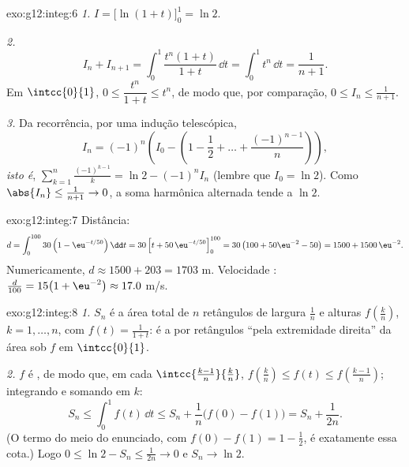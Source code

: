 \begin{solution}{exo:g12:integ:6}
\emph{1.} $I = \bigl[\ln(1+t)\bigr]_0^1 = \ln 2$.

\emph{2.}
\[
I_n + I_{n+1} = \int_0^1 \frac{t^n(1 + t)}{1+t}\,\dd t
= \int_0^1 t^n \,\dd t = \frac{1}{n+1}.
\]
Em $\intcc{0}{1}$, $0 \leq \dfrac{t^n}{1+t} \leq t^n$, de modo que, por
comparação, $0 \leq I_n \leq \frac{1}{n+1}$.

\emph{3.} Da recorrência, por uma indução telescópica,
\[
I_n = (-1)^n\left(I_0 - \left(1 - \frac12 + \dots + \frac{(-1)^{n-1}}{n}\right)\right),
\]
\emph{isto é},
$\displaystyle\sum_{k=1}^{n} \frac{(-1)^{k-1}}{k} = \ln 2 - (-1)^n I_n$
(lembre que $I_0 = \ln 2$). Como $\abs{I_n} \leq \frac{1}{n+1} \to 0$, a
soma harmônica alternada tende a $\ln 2$.
\end{solution}

\begin{solution}{exo:g12:integ:7}
Distância:
\[
d = \int_0^{100} 30\left(1 - \eu^{-t/50}\right)\dd t
= 30\left[t + 50\,\eu^{-t/50}\right]_0^{100}
= 30\left(100 + 50\eu^{-2} - 50\right)
= 1500 + 1500\,\eu^{-2}.
\]
Numericamente, $d \approx 1500 + 203 = 1703$ m. Velocidade :
$\frac{d}{100} = 15\bigl(1 + \eu^{-2}\bigr) \approx 17.0$ m/s.
\end{solution}

\begin{solution}{exo:g12:integ:8}
\emph{1.} $S_n$ é a área total de $n$ retângulos de largura $\frac1n$ e
alturas $f\left(\frac kn\right)$, $k = 1, \dots, n$, com
$f(t) = \frac{1}{1+t}$: é a  por retângulos ``pela extremidade
direita'' da área sob $f$ em $\intcc{0}{1}$.

\emph{2.} $f$ é , de modo que, em cada 
$\intcc{\frac{k-1}{n}}{\frac kn}$,
$f\left(\frac kn\right) \leq f(t) \leq f\left(\frac{k-1}{n}\right)$;
integrando e somando em $k$:
\[
S_n \leq \int_0^1 f(t)\,\dd t \leq S_n + \frac1n\bigl(f(0) - f(1)\bigr)
= S_n + \frac{1}{2n}.
\]
(O termo do meio do enunciado, com $f(0) - f(1) = 1 - \frac12$, é
exatamente essa cota.) Logo $0 \leq \ln 2 - S_n \leq \frac{1}{2n} \to 0$ e
$S_n \to \ln 2$.
\end{solution}

